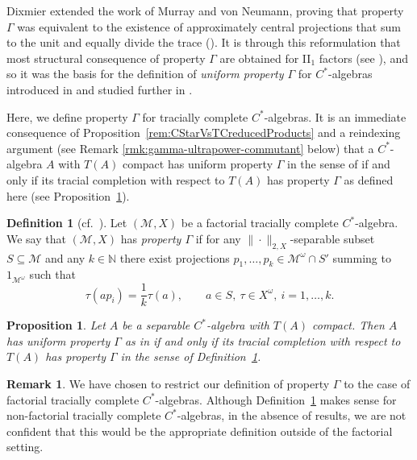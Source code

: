\documentclass[a4paper,11pt]{amsart}
\newtheorem{proposition}[theorem]{Proposition}
\theoremstyle{definition}
\newtheorem{definition}[theorem]{Definition}
\newtheorem{remark}[theorem]{Remark}
\numberwithin{equation}{section}
\numberwithin{theorem}{section}
\newcommand{\N}{\mathbb N}
\newcommand{\M}{\mathcal{M}}
\begin{document}
Dixmier extended the work of Murray and von Neumann, proving that property $\Gamma$ was equivalent to the existence of approximately central projections that sum to the unit and equally divide the trace (\cite{Di69}).  It is through this reformulation that most structural consequence of property $\Gamma$ are obtained for II$_1$ factors (see \cite{Chr01,CPSS03,GP98,Pi01}), and so it was the basis for the definition of \emph{uniform property $\Gamma$} for $C^*$-algebras introduced in \cite{CETWW} and studied further in \cite{CETW}.  

Here, we define property $\Gamma$ for tracially complete $C^*$-algebras. It is an immediate consequence of Proposition~\ref{rem:CStarVsTCreducedProducts} and a reindexing argument (see Remark \ref{rmk:gamma-ultrapower-commutant} below) that a $C^*$-algebra $A$ with $T(A)$ compact has uniform property $\Gamma$ in the sense of \cite[Definition 2.1]{CETWW} if and only if its tracial completion with respect to $T(A)$ has property $\Gamma$ as defined here (see Proposition~\ref{prop:Gamma-Agrees}).

\begin{definition}[{cf.\ \cite[Definition~2.1]{CETWW}}]\label{def:UTCgamma}
Let $(\M,X)$ be a factorial tracially complete $C^*$-algebra.  We say that $(\M,X)$ has \emph{property $\Gamma$} if for any $\|\cdot\|_{2, X}$-separable subset $S \subseteq \M$ and any $k \in \N$ there exist projections $p_1,\ldots,p_k \in \M^\omega \cap S'$ summing to $1_{\M^\omega}$ such that
\begin{equation}\label{eq:tracially-divides}
  \tau(ap_i) = \frac1k\tau(a),\qquad  a \in S,\ \tau\in X^\omega,\ i=1,\dots,k.
\end{equation}
\end{definition}

\begin{proposition}\label{prop:Gamma-Agrees}
    Let $A$ be a separable $C^*$-algebra with $T(A)$ compact.
    Then $A$ has uniform property $\Gamma$ as in \cite[Definition~2.1]{CETWW} if and only if its tracial completion with respect to $T(A)$ has property $\Gamma$ in the sense of Definition~\ref{def:UTCgamma}.
\end{proposition}



\begin{remark}
We have chosen to restrict our definition of property $\Gamma$ to the case of factorial tracially complete $C^*$-algebras. Although Definition~\ref{def:UTCgamma} makes sense for non-factorial tracially complete $C^*$-algebras, in the absence of results, we are not confident that this would be the appropriate definition outside of the factorial setting.
\end{remark}
\end{document}
